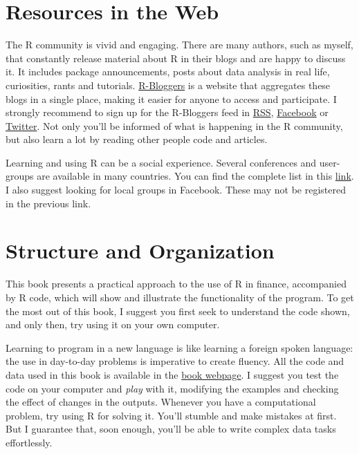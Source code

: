 \documentclass[11pt,]{book}
\begin{document}
\section{Resources in the Web}\label{resources-in-the-web}

The R community is vivid and engaging. There are many authors, such as
myself, that constantly release material about R in their blogs and are
happy to discuss it. It includes package announcements, posts about data
analysis in real life, curiosities, rants and tutorials.
\href{https://www.r-bloggers.com/}{R-Bloggers} is a website that
aggregates these blogs in a single place, making it easier for anyone to
access and participate. I strongly recommend to sign up for the
R-Bloggers feed in \href{https://feeds.feedburner.com/RBloggers}{RSS},
\href{https://www.facebook.com/rbloggers/?fref=ts}{Facebook} or
\href{https://twitter.com/Rbloggers}{Twitter}. Not only you'll be
informed of what is happening in the R community, but also learn a lot
by reading other people code and articles.

Learning and using R can be a social experience. Several conferences and
user-groups are available in many countries. You can find the complete
list in this
\href{https://jumpingrivers.github.io/meetingsR/index.html}{link}. I
also suggest looking for local groups in Facebook. These may not be
registered in the previous link.

\section{Structure and Organization}\label{structure-and-organization}

This book presents a practical approach to the use of R in finance,
accompanied by R code, which will show and illustrate the functionality
of the program. To get the most out of this book, I suggest you first
seek to understand the code shown, and only then, try using it on your
own computer.

Learning to program in a new language is like learning a foreign spoken
language: the use in day-to-day problems is imperative to create
fluency. All the code and data used in this book is available in the
\href{https://sites.google.com/view/pmfdr/home}{book webpage}. I suggest
you test the code on your computer and \emph{play} with it, modifying
the examples and checking the effect of changes in the outputs. Whenever
you have a computational problem, try using R for solving it. You'll
stumble and make mistakes at first. But I guarantee that, soon enough,
you'll be able to write complex data tasks effortlessly.
\end{document}
